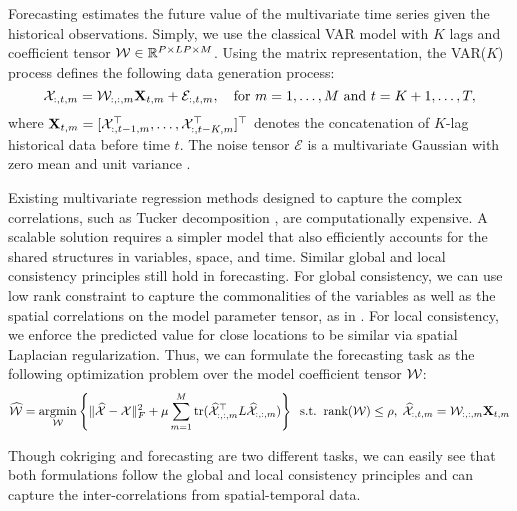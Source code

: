 Forecasting estimates the future value of the multivariate time series given the historical observations. Simply, we use the classical VAR model with  $K$ lags and coefficient tensor ${\mathcal W} \in \mathbb{R}^{P\times LP\times M}$. Using the matrix representation, the VAR($K$) process defines the following data generation process:
\begin{equation}
{\mathcal X}_{:,t,m} = \mathcal{W}_{:,:, m}\mathbf{X}_{t, m} + \mathcal{E}_{:,t,m}, \quad \text{for } m = 1, \ldots, M \text{ and } t = K+1, \ldots, T,
\label{eqn:auto-regressive} 
\end{equation}
\noindent where $\mathbf{X}_{t, m} = [{\mathcal X}_{:, t-1, m}^{\top}, \ldots, {\mathcal X}_{:, t-K, m}^{\top}]^{\top}$ denotes the concatenation of $K$-lag historical data before time $t$. The noise tensor $\mathcal{E}$ is a multivariate Gaussian with zero mean and unit variance .

Existing multivariate regression methods designed to capture the complex correlations, such as Tucker decomposition \cite{romera2013multilinear}, are computationally expensive. 
A scalable solution requires a simpler model that also efficiently accounts for the shared structures in variables, space, and time. Similar global and local consistency principles still hold in forecasting. For global consistency, we can use low rank constraint to capture the commonalities of the variables as well as the spatial correlations on the model parameter tensor, as in \cite{cressie2010fixed}. For local consistency, we enforce the predicted value for close locations to be similar via spatial Laplacian regularization. Thus, we can formulate the forecasting task as the following optimization problem over the model coefficient tensor ${\mathcal W}$:
\begin{equation}
\widehat{{\mathcal W}} = \operatorname*{argmin}_{{\mathcal W}} \left\{ \| \widehat{{\mathcal X}}- {\mathcal X} \|^2_F +  \mu \sum\limits_{m=1}^M \text{tr} (\widehat{{\mathcal X}}_{:,:,m}^\top L \widehat{{\mathcal X}}_{:,:,m}) \right\} 
\;\;\text{s.t.} \;\; \text{rank}({\mathcal W}) \leq \rho, \; \widehat{{\mathcal X}}_{:,t,m} = \mathcal{W}_{:,:, m}\mathbf{X}_{t, m}
\label{eqn:forecasting}
\end{equation}

Though cokriging and forecasting are two different tasks, we can easily see that both formulations follow the global and local consistency principles and can capture the inter-correlations from spatial-temporal data.

 